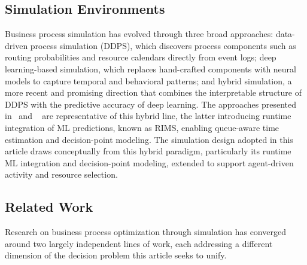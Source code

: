 \documentclass[runningheads]{llncs}
\begin{document}
\subsection{Simulation Environments}
\label{subsec:related_work_simulation_env}

Business process simulation has evolved through three broad approaches: data-driven process simulation (DDPS), which discovers process components such as routing probabilities and resource calendars directly from event logs; deep learning-based simulation, which replaces hand-crafted components with neural models to capture temporal and behavioral patterns; and hybrid simulation, a more recent and promising direction that combines the interpretable structure of DDPS with the predictive accuracy of deep learning. The approaches presented in~\cite{camargo2023hybrid} and ~\cite{Runtime_integration_of_simulation_for_business_processes} are representative of this hybrid line, the latter introducing runtime integration of ML predictions, known as RIMS, enabling queue-aware time estimation and decision-point modeling. The simulation design adopted in this article draws conceptually from this hybrid paradigm, particularly its runtime ML integration and decision-point modeling, extended to support agent-driven activity and resource selection.

\subsection{Related Work}

Research on business process optimization through simulation has converged around two largely independent lines of work, each addressing a different dimension of the decision problem this article seeks to unify.
\end{document}
